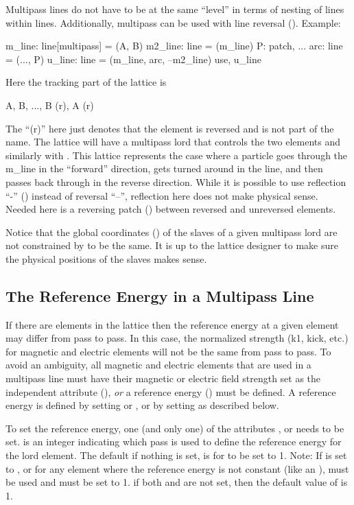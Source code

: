 Multipass lines do not have to be at the same ``level'' in terms of
nesting of lines within lines. Additionally, multipass can be used with line reversal
(). Example:
\begin{example}
  m_line: line[multipass] = (A, B)
  m2_line: line = (m_line)
  P: patch, ...
  arc: line = (..., P)
  u_line: line = (m_line, arc, --m2_line)
  use, u_line
\end{example}
Here the tracking part of the lattice is
\begin{example}
  A, B, ..., B (r), A (r)
\end{example}
The ``(r)'' here just denotes that the element is reversed and is not
part of the name. The lattice will have a multipass lord  that
controls the two  elements and similarly with . This
lattice represents the case where a particle goes through the m_line
in the ``forward'' direction, gets turned around in the  line,
and then passes back through  in the reverse direction.
While it is possible to use reflection ``-'' ()
instead of reversal ``--'', reflection here does not make physical
sense.  Needed here is a reversing patch  ()
between reversed and unreversed elements.

Notice that the global coordinates () of the slaves of
a given multipass lord are not constrained by \bmad to be the same. It
is up to the lattice designer to make sure the physical positions of
the slaves makes sense.

\subsection{The Reference Energy in a Multipass Line}
\label{s:ref.e.multi}

If there are  elements in the lattice then the reference
energy at a given element may differ from pass to pass. In this case,
the normalized strength (k1, kick, etc.) for magnetic and electric
elements will not be the same from pass to pass. To avoid an
ambiguity, all magnetic and electric elements that are used in a
multipass line must have their magnetic or electric field strength set
as the independent attribute (), {\em or} a reference
energy () must be defined. A reference energy is
defined by setting  or , or by setting
 as described below. 

To set the reference energy, one (and only one) of the attributes
,  or  needs to be
set.  is an integer indicating which pass is used to
define the reference energy for the lord element. The default if
nothing is set, is for  to be set to 1.  Note: If
 is set to , or for any element
where the reference energy is not constant (like an ),
 must be used and must be set to 1. if both 
and  are not set, then the default value of 
is 1.

